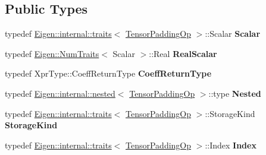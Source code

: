 \subsection*{Public Types}
\begin{DoxyCompactItemize}
\item 
\mbox{\label{class_eigen_1_1_tensor_padding_op_ab5de6c66d7a10e746609ba824c909f5d}} 
typedef \hyperlink{struct_eigen_1_1internal_1_1traits}{Eigen\+::internal\+::traits}$<$ \hyperlink{class_eigen_1_1_tensor_padding_op}{Tensor\+Padding\+Op} $>$\+::Scalar {\bfseries Scalar}
\item 
\mbox{\label{class_eigen_1_1_tensor_padding_op_a8725abf6611cc6868211f21bd7a34df0}} 
typedef \hyperlink{group___core___module_struct_eigen_1_1_num_traits}{Eigen\+::\+Num\+Traits}$<$ Scalar $>$\+::Real {\bfseries Real\+Scalar}
\item 
\mbox{\label{class_eigen_1_1_tensor_padding_op_a03d812907c627e4669763b0cce1f5861}} 
typedef Xpr\+Type\+::\+Coeff\+Return\+Type {\bfseries Coeff\+Return\+Type}
\item 
\mbox{\label{class_eigen_1_1_tensor_padding_op_abd4bea6390103e3fd014b1ef6d27f71b}} 
typedef \hyperlink{struct_eigen_1_1internal_1_1nested}{Eigen\+::internal\+::nested}$<$ \hyperlink{class_eigen_1_1_tensor_padding_op}{Tensor\+Padding\+Op} $>$\+::type {\bfseries Nested}
\item 
\mbox{\label{class_eigen_1_1_tensor_padding_op_a6f349272eaddec6978350ef676160986}} 
typedef \hyperlink{struct_eigen_1_1internal_1_1traits}{Eigen\+::internal\+::traits}$<$ \hyperlink{class_eigen_1_1_tensor_padding_op}{Tensor\+Padding\+Op} $>$\+::Storage\+Kind {\bfseries Storage\+Kind}
\item 
\mbox{\label{class_eigen_1_1_tensor_padding_op_a1d8e56fe8fa67418b6fbdca29bb6f7ba}} 
typedef \hyperlink{struct_eigen_1_1internal_1_1traits}{Eigen\+::internal\+::traits}$<$ \hyperlink{class_eigen_1_1_tensor_padding_op}{Tensor\+Padding\+Op} $>$\+::Index {\bfseries Index}
\item 
\mbox{\label{class_eigen_1_1_tensor_padding_op_ab5de6c66d7a10e746609ba824c909f5d}} 

\end{DoxyCompactItemize}
